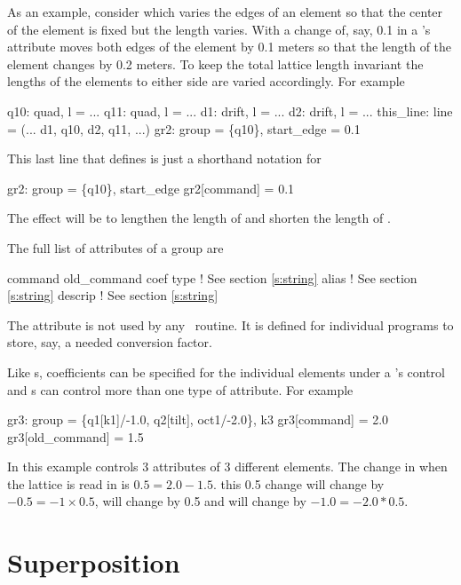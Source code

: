 As an example, consider  which varies the edges of
an element so that the center of the element is fixed but the length
varies. With  a change of, say, 0.1 in a
's  attribute moves both edges of the element by
0.1 meters so that the length of the element changes by 0.2 meters. To
keep the total lattice length invariant the lengths of the elements to
either side are varied accordingly.  For example
\begin{example}
  q10: quad, l = ...
  q11: quad, l = ...
  d1: drift, l = ...
  d2: drift, l = ...
  this_line: line = (... d1, q10, d2, q11, ...)
  gr2: group = \{q10\}, start_edge = 0.1
\end{example}
This last line that defines  is just a shorthand notation for
\begin{example}
  gr2: group = \{q10\}, start_edge 
  gr2[command] = 0.1
\end{example}
The effect will be to lengthen the length of  and shorten the
length of .

The full list of attributes of a group are
\begin{example}
  command         
  old_command     
  coef            
  type            ! See section \ref{s:string}
  alias           ! See section \ref{s:string}
  descrip         ! See section \ref{s:string}
\end{example}
The  attribute is not used by any \bmad\ routine. It is
defined for individual programs to store, say, a needed conversion
factor.

Like s, coefficients can be specified for the individual
elements under a 's control and s can control more
than one type of attribute. For example
\begin{example}
  gr3: group = \{q1[k1]/-1.0, q2[tilt], oct1/-2.0\}, k3
  gr3[command] = 2.0
  gr3[old_command] = 1.5
\end{example}
In this example  controls 3 attributes of 3 different
elements.  The change in  when the lattice is read in is $0.5
= 2.0 - 1.5$.  this 0.5 change will change  by $-0.5 = -1
\times 0.5$,  will change by 0.5 and  will
change by $-1.0 = -2.0 * 0.5$.

\section{Superposition}
\label{s:super}


